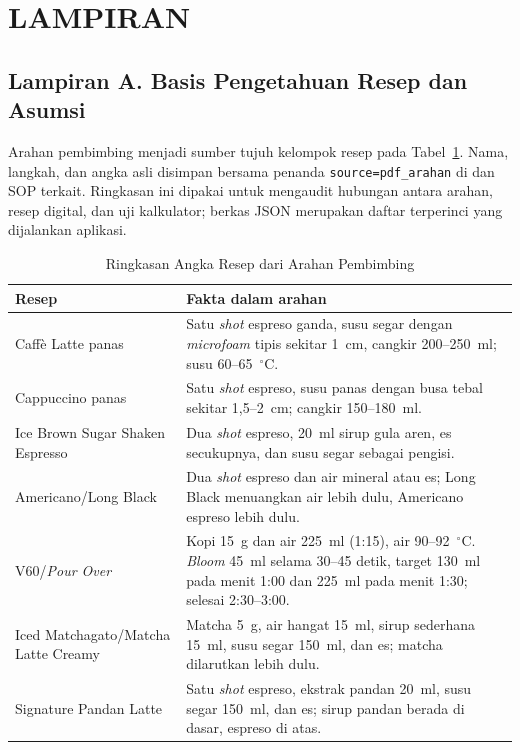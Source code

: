 \clearpage
\chapter*{LAMPIRAN}
{}
\setcounter{table}{0}
\renewcommand{\thetable}{L.\arabic{table}}
\setcounter{figure}{0}
\renewcommand{\thefigure}{L.\arabic{figure}}

\section*{Lampiran A. Basis Pengetahuan Resep dan Asumsi}
{}

Arahan pembimbing menjadi sumber tujuh kelompok resep pada Tabel~\ref{tab:lampiran-resep}. Nama, langkah, dan angka asli disimpan bersama penanda \texttt{source=pdf\_arahan} di  dan SOP terkait. Ringkasan ini dipakai untuk mengaudit hubungan antara arahan, resep digital, dan uji kalkulator; berkas JSON merupakan daftar terperinci yang dijalankan aplikasi.

\begin{table}[htbp]
\centering
\caption{Ringkasan Angka Resep dari Arahan Pembimbing}
\label{tab:lampiran-resep}
\small
\begin{tabular}{>{\RaggedRight\arraybackslash}p{}>{\RaggedRight\arraybackslash}p{}}
\toprule
Resep & Fakta dalam arahan \\
\midrule
Caffè Latte panas & Satu \textit{shot} espreso ganda, susu segar dengan \textit{microfoam} tipis sekitar 1~cm, cangkir 200--250~ml; susu 60--65~$^\circ$C. \\
Cappuccino panas & Satu \textit{shot} espreso, susu panas dengan busa tebal sekitar 1,5--2~cm; cangkir 150--180~ml. \\
Ice Brown Sugar Shaken Espresso & Dua \textit{shot} espreso, 20~ml sirup gula aren, es secukupnya, dan susu segar sebagai pengisi. \\
Americano/Long Black & Dua \textit{shot} espreso dan air mineral atau es; Long Black menuangkan air lebih dulu, Americano espreso lebih dulu. \\
V60/\textit{Pour Over} & Kopi 15~g dan air 225~ml (1:15), air 90--92~$^\circ$C. \textit{Bloom} 45~ml selama 30--45 detik, target 130~ml pada menit 1:00 dan 225~ml pada menit 1:30; selesai 2:30--3:00. \\
Iced Matchagato/Matcha Latte Creamy & Matcha 5~g, air hangat 15~ml, sirup sederhana 15~ml, susu segar 150~ml, dan es; matcha dilarutkan lebih dulu. \\
Signature Pandan Latte & Satu \textit{shot} espreso, ekstrak pandan 20~ml, susu segar 150~ml, dan es; sirup pandan berada di dasar, espreso di atas. \\
\bottomrule
\end{tabular}
\end{table}

